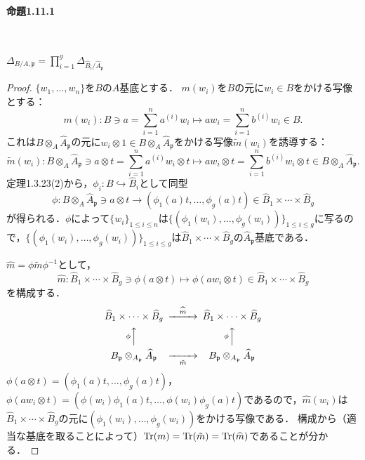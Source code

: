 \paragraph{命題1.11.1}~
\begin{screen}
  $\varDelta_{B/A,\mathfrak{p}}=\prod_{i=1}^g\varDelta_{\widehat{B}_i/\widehat{A}_\mathfrak{p}}$
\end{screen}
\begin{proof}
  $\{w_1, \ldots, w_n\}$を$B$の$A$基底とする．
  $m(w_i)$を$B$の元に$w_i \in B$をかける写像とする：
  \[m(w_i) \colon B \ni a = \sum_{i=1}^n a^{(i)}w_i \mapsto aw_i = \sum_{i=1}^n b^{(i)}w_i \in B.\]
  これは$B \otimes_A \widehat{A}_\mathfrak{p}$の元に$w_i \otimes 1 \in B \otimes_A \widehat{A}_\mathfrak{p}$をかける写像$\tilde{m}(w_i)$を誘導する：
  \[\tilde{m}(w_i) \colon B \otimes_A \widehat{A}_\mathfrak{p} \ni a \otimes t = \sum_{i=1}^n a^{(i)}w_i \otimes t \mapsto aw_i \otimes t = \sum_{i=1}^n b^{(i)}w_i \otimes t \in B \otimes_A \widehat{A}_\mathfrak{p}.\]
  定理1.3.23(2)から，$\phi_i\colon B\hookrightarrow\widehat{B}_i$として同型
  \[\phi\colon B \otimes_A \widehat{A}_\mathfrak{p} \ni a\otimes t\rightarrow(\phi_1(a)t, \ldots, \phi_g(a)t) \in \widehat{B}_1 \times \cdots \times \widehat{B}_g\]
  が得られる．$\phi$によって$\{w_i\}_{1 \leq i \leq n}$は$\{(\phi_1(w_i), \ldots, \phi_g(w_i))\}_{1 \leq i \leq g}$に写るので，$\{(\phi_1(w_i), \ldots, \phi_g(w_i))\}_{1 \leq i \leq g}$は$\widehat{B}_1 \times \cdots \times \widehat{B}_g$の$\widehat{A}_\mathfrak{p}$基底である．

  $\widehat{m}=\phi \tilde{m} \phi^{-1}$として，
  \[\widehat{m} \colon \widehat{B}_1\times\cdots\times\widehat{B}_g \ni \phi(a \otimes t) \mapsto \phi(aw_i \otimes t) \in \widehat{B}_1\times\cdots\times\widehat{B}_g\]
  を構成する．
  \[
  \begin{CD}
    \widehat{B}_1\times\cdots\times\widehat{B}_g @>{\widehat{m}}>> \widehat{B}_1\times\cdots\times\widehat{B}_g\\
    @A{\phi}AA  @A{\phi}AA\\
    B_\mathfrak{p}\otimes_{A_\mathfrak{p}}\widehat{A}_\mathfrak{p} @>>{\tilde{m}}> B_\mathfrak{p}\otimes_{A_\mathfrak{p}}\widehat{A}_\mathfrak{p}\\
  \end{CD}
  \]
  $\phi(a \otimes t)=(\phi_1(a)t, \ldots, \phi_g(a)t)$，$\phi(aw_i \otimes t)=(\phi(w_i)\phi_1(a)t, \ldots, \phi(w_i)\phi_g(a)t)$であるので，$\widehat{m}(w_i)$は$\widehat{B}_1\times\cdots\times\widehat{B}_g$の元に$(\phi_1(w_i), \ldots, \phi_g(w_i))$をかける写像である．
  構成から（適当な基底を取ることによって）$\operatorname{Tr}(m)=\operatorname{Tr}(\tilde{m})=\operatorname{Tr}(\widehat{m})$であることが分かる．


\end{proof}
